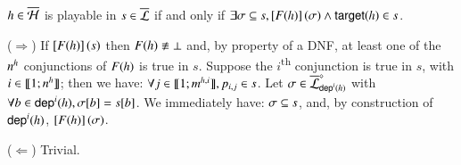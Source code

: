 \begin{theorem}
\label{th:ppplaysubset}
  $h \in \overline{\mathcal{H}}$ is playable in $s \in \overline{\mathcal{L}}$ if and only if
  $\exists \sigma \subseteq s, \left[F(h)\right](\sigma) \wedge \mathsf{target}(h) \in s$.
\end{theorem}
%
\begin{proofppplaysubset}
  ($\Rightarrow$) If $\left[F(h)\right](s)$ then $F(h) \not\equiv \bot$ and, by property of a DNF,
    at least one of the $n^{h}$ conjunctions of $F(h)$ is true in $s$.
    Suppose the $i$\textsuperscript{th} conjunction is true in $s$, with $i \in \llbracket 1; n^{h} \rrbracket$;
    then we have: $\forall j \in \llbracket 1; m^{h,i} \rrbracket, p_{i,j} \in s$.
    Let $\sigma \in \overline{\mathcal{L}}^\diamond_{\mathsf{dep}^{i}(h)}$
    with $\forall b \in \mathsf{dep}^{i}(h), {\sigma[b]} = {s[b]}$.
    We immediately have: $\sigma \subseteq s$,
    and, by construction of $\mathsf{dep}^{i}(h)$, $\left[F(h)\right](\sigma)$.
  
  ($\Leftarrow$) Trivial.
\end{proofppplaysubset}

